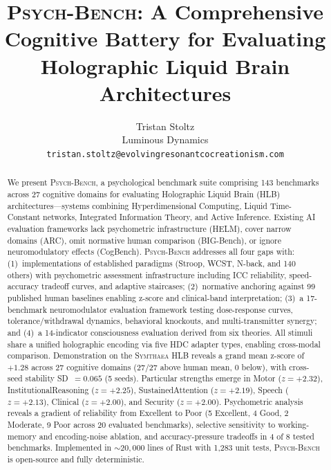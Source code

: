 \documentclass[11pt,letterpaper]{article}
\newcommand{\symthaea}{\textsc{Symthaea}}
\newcommand{\psychbench}{\textsc{Psych-Bench}}
\newcommand{\hlb}{\textsc{HLB}}
\begin{document}
\title{\psychbench{}: A Comprehensive Cognitive Battery for Evaluating\\
Holographic Liquid Brain Architectures}

\author{Tristan Stoltz\\
Luminous Dynamics\\
\texttt{tristan.stoltz@evolvingresonantcocreationism.com}}

\date{}
\maketitle

\begin{abstract}
\noindent
We present \psychbench{}, a psychological benchmark suite comprising 143 benchmarks across 27 cognitive domains for evaluating Holographic Liquid Brain (\hlb{}) architectures---systems combining Hyperdimensional Computing, Liquid Time-Constant networks, Integrated Information Theory, and Active Inference. Existing AI evaluation frameworks lack psychometric infrastructure (HELM), cover narrow domains (ARC), omit normative human comparison (BIG-Bench), or ignore neuromodulatory effects (CogBench). \psychbench{} addresses all four gaps with: (1)~implementations of established paradigms (Stroop, WCST, N-back, and 140 others) with psychometric assessment infrastructure including ICC reliability, speed-accuracy tradeoff curves, and adaptive staircases; (2)~normative anchoring against 99 published human baselines enabling z-score and clinical-band interpretation; (3)~a 17-benchmark neuromodulator evaluation framework testing dose-response curves, tolerance/withdrawal dynamics, behavioral knockouts, and multi-transmitter synergy; and (4)~a 14-indicator consciousness evaluation derived from six theories. All stimuli share a unified holographic encoding via five HDC adapter types, enabling cross-modal comparison. Demonstration on the \symthaea{} \hlb{} reveals a grand mean z-score of $+1.28$ across 27 cognitive domains (27/27 above human mean, 0 below), with cross-seed stability SD~$= 0.065$ (5 seeds). Particular strengths emerge in Motor ($z = +2.32$), InstitutionalReasoning ($z = +2.25$), SustainedAttention ($z = +2.19$), Speech ($z = +2.13$), Clinical ($z = +2.00$), and Security ($z = +2.00$). Psychometric analysis reveals a gradient of reliability from Excellent to Poor (5 Excellent, 4 Good, 2 Moderate, 9 Poor across 20 evaluated benchmarks), selective sensitivity to working-memory and encoding-noise ablation, and accuracy-pressure tradeoffs in 4 of 8 tested benchmarks. Implemented in ${\sim}20{,}000$ lines of Rust with 1,283 unit tests, \psychbench{} is open-source and fully deterministic.
\end{abstract}
\end{document}
